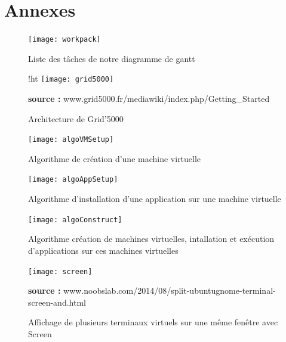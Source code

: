 \documentclass{report}
\begin{document}
\chapter*{Annexes}

    \begin{figure}[!ht]
        \centering{}\texttt{[image: workpack]}
        \caption{Liste des tâches de notre diagramme de gantt}
        \label{gantt}
    \end{figure}

    \begin{figure}{!ht}
        \centering{}\texttt{[image: grid5000]}
        \caption{Architecture de Grid'5000}
        \label{grid5000}
        \hspace{\linewidth}
        \textbf{source : }www.grid5000.fr/mediawiki/index.php/Getting\_Started
    \end{figure}

    \begin{figure}[!ht]
        \centering{}\texttt{[image: algoVMSetup]}
        \caption{Algorithme de création d'une machine virtuelle}
        \label{vmsetup}
    \end{figure}

    \begin{figure}[!ht]
        \centering{}\texttt{[image: algoAppSetup]}
        \caption{Algorithme d'installation d'une application sur une machine virtuelle}
        \label{appsetup}
    \end{figure}

    \begin{figure}[!ht]
        \centering{}\texttt{[image: algoConstruct]}
        \caption{Algorithme création de machines virtuelles, intallation et exécution d'applications sur ces machines virtuelles}
        \label{construct}
    \end{figure}

    \begin{figure}[!ht]
        \centering{}\texttt{[image: screen]}
        \caption{Affichage de plusieurs terminaux virtuels sur une même fenêtre avec Screen}
        \label{screen}
        \hspace{\linewidth}
        \textbf{source : }www.noobslab.com/2014/08/split-ubuntugnome-terminal-screen-and.html
    \end{figure}
\end{document}

